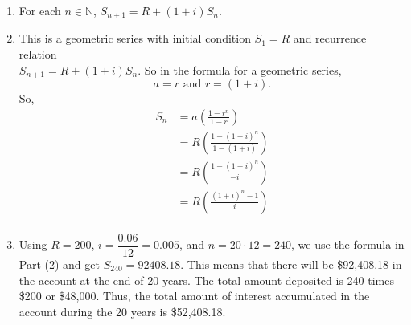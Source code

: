 \documentclass[11pt]{article}
\begin{document}
\begin{enumerate}
\item For each $n \in \mathbb{N}$, $S_{n+1} = R + \left( {1+i} \right) S_n$.

\item This is a geometric series with initial condition  $S_1 = R$ and recurrence relation  \\
$S_{n+1} = R + \left( {1+i} \right) S_n$.  So in the  formula for a geometric series,
\[
a = r \text{ and } r = \left( {1+i} \right).
\]
So,
\[
\begin{aligned}
  S_n  &= a\left( {\frac{{1 - r^n }}{{1 - r}}} \right) \\
       &= R\left( {\frac{{1 - \left( {1 + i} \right)^n }}{{1 - \left( {1 + i} \right)}}} \right) \\
       &= R\left( {\frac{{1 - \left( {1 + i} \right)^n }}{{ - i}}} \right) \\
       &= R\left( {\frac{{\left( {1 + i} \right)^n  - 1}}{i}} \right)  \\ 
\end{aligned}
\]
\item Using $R = 200$, $i = \dfrac{0.06}{12} = 0.005$, and $n = 20 \cdot 12 = 240$, we use the formula in Part (2) and get $S_{240} = 92408.18$.  This means that there will be \$92,408.18 in the account at the end of 20 years.  The total amount deposited is 240 times \$200 or \$48,000.  Thus, the total amount of interest accumulated in the account during the 20 years is \$52,408.18. 


\end{enumerate}
\end{document}
